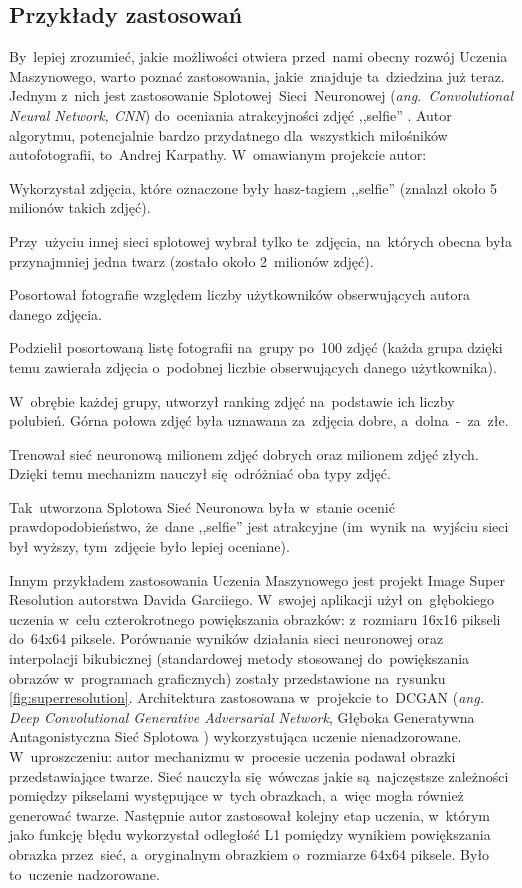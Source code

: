 \documentclass[oneside, 11pt, a4paper]{article}
\begin{document}
\begin{multicols}{2}
\section{Przykłady zastosowań}
By~lepiej zrozumieć, jakie możliwości otwiera przed~nami obecny rozwój Uczenia Maszynowego, warto poznać zastosowania, jakie~znajduje ta~dziedzina już teraz. Jednym z~nich jest zastosowanie Splotowej~Sieci~Neuronowej (\textit{\mbox{ang.~Convolutional} Neural Network, CNN}) do~oceniania atrakcyjności zdjęć ,,selfie'' \cite{SelfieCNN}. Autor algorytmu, potencjalnie bardzo przydatnego dla~wszystkich miłośników autofotografii, to~Andrej Karpathy. W~omawianym projekcie autor:
\begin{compactenum}
	\item Wykorzystał zdjęcia, które oznaczone były hasz-tagiem ,,selfie'' (znalazł około 5 milionów takich zdjęć).
	\item Przy~użyciu innej sieci splotowej wybrał tylko te~zdjęcia, na~których obecna była przynajmniej jedna twarz (zostało około 2~milionów zdjęć).
	\item Posortował fotografie względem liczby użytkowników obserwujących autora danego zdjęcia.
	\item Podzielił posortowaną listę fotografii na~grupy po~100 zdjęć (każda grupa dzięki temu zawierała zdjęcia o~podobnej liczbie obserwujących danego użytkownika).
	\item W~obrębie każdej grupy, utworzył ranking zdjęć na~podstawie ich liczby polubień. Górna połowa zdjęć była uznawana za~zdjęcia dobre, a~dolna~-~za~złe.
	\item Trenował sieć neuronową milionem zdjęć dobrych oraz milionem zdjęć złych. Dzięki temu mechanizm nauczył się~odróżniać oba typy zdjęć.
\end{compactenum}
Tak~utworzona Splotowa Sieć Neuronowa była w~stanie ocenić prawdopodobieństwo, że~dane ,,selfie'' jest atrakcyjne (im~wynik na~wyjściu sieci był wyższy, tym~zdjęcie było lepiej oceniane).

Innym przykładem zastosowania Uczenia Maszynowego jest projekt Image Super Resolution \cite{SuperResolution} autorstwa Davida Garciiego. W~swojej aplikacji użył on~głębokiego uczenia w~celu czterokrotnego powiększania obrazków: z~rozmiaru 16x16 pikseli do~64x64 piksele. Porównanie wyników działania sieci neuronowej oraz interpolacji bikubicznej (standardowej metody stosowanej do~powiększania obrazów w~programach graficznych) zostały przedstawione na~rysunku \ref{fig:superresolution}.
Architektura zastosowana w~projekcie to~DCGAN (\textit{ang. Deep Convolutional Generative Adversarial Network}, Głęboka Generatywna Antagonistyczna Sieć Splotowa \cite{DBLP:journals/corr/RadfordMC15}) wykorzystująca uczenie nienadzorowane.
W~uproszczeniu: autor mechanizmu w~procesie uczenia podawał obrazki przedstawiające twarze. Sieć nauczyła się~wówczas jakie są~najczęstsze zależności pomiędzy pikselami występujące w~tych obrazkach, a~więc mogła również generować twarze. Następnie autor zastosował kolejny etap uczenia, w~którym jako funkcję błędu wykorzystał odległość L1 pomiędzy wynikiem powiększania obrazka przez~sieć, a~oryginalnym obrazkiem o~rozmiarze 64x64 piksele. Było to~uczenie nadzorowane.


\end{multicols}
\end{document}
